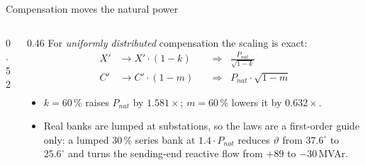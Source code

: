 \begin{frame}{Compensation moves the natural power}
  \begin{columns}[c,onlytextwidth]
    \begin{column}{0.52\textwidth}\centering
    \end{column}
    \begin{column}{0.46\textwidth}
      {\small For \emph{uniformly distributed} compensation the scaling is
      exact:
      \[ \begin{aligned}
        X'&\to X'\cdot\left(1-k\right)
          &&\Rightarrow\;\; \frac{P_{nat}}{\sqrt{1-k}}\\[0.3em]
        C'&\to C'\cdot\left(1-m\right)
          &&\Rightarrow\;\; P_{nat}\cdot\sqrt{1-m}
      \end{aligned} \]}
      {\small
      \begin{itemize}
        \setlength{\itemsep}{0.3em}
        \item $k=60$\,\% raises $P_{nat}$ by $1.581\times$; $m=60$\,\% lowers
              it by $0.632\times$.
        \item Real banks are lumped at substations, so the laws are a
              first-order guide only: a lumped 30\,\% series bank at
              $1.4\cdot P_{nat}$ reduces $\vartheta$ from $37.6^\circ$ to
              $25.6^\circ$ and turns the sending-end reactive flow from
              $+89$ to $-30$\,MVAr.
      \end{itemize}}
    \end{column}
  \end{columns}
\end{frame}
